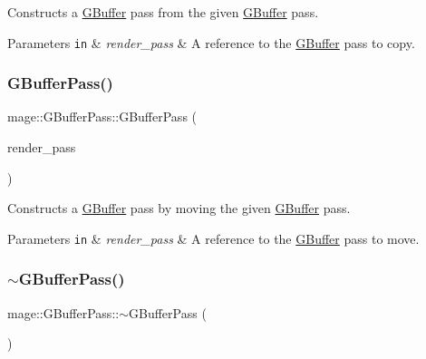 Constructs a \hyperlink{structmage_1_1_g_buffer}{G\+Buffer} pass from the given \hyperlink{structmage_1_1_g_buffer}{G\+Buffer} pass.


\begin{DoxyParams}[1]{Parameters}
\mbox{\tt in}  & {\em render\+\_\+pass} & A reference to the \hyperlink{structmage_1_1_g_buffer}{G\+Buffer} pass to copy. \\
\hline
\end{DoxyParams}
\hypertarget{classmage_1_1_g_buffer_pass_a61a520a53c7a8029280eb1fc62d71ce6}{}\label{classmage_1_1_g_buffer_pass_a61a520a53c7a8029280eb1fc62d71ce6} 
\subsubsection{\texorpdfstring{G\+Buffer\+Pass()}{GBufferPass()}\hspace{0.1cm}{\footnotesize\ttfamily [3/3]}}
{\footnotesize\ttfamily mage\+::\+G\+Buffer\+Pass\+::\+G\+Buffer\+Pass (\begin{DoxyParamCaption}\item[{\hyperlink{classmage_1_1_g_buffer_pass}{G\+Buffer\+Pass} \&\&}]{render\+\_\+pass }\end{DoxyParamCaption})\hspace{0.3cm}{\ttfamily [default]}}

Constructs a \hyperlink{structmage_1_1_g_buffer}{G\+Buffer} pass by moving the given \hyperlink{structmage_1_1_g_buffer}{G\+Buffer} pass.


\begin{DoxyParams}[1]{Parameters}
\mbox{\tt in}  & {\em render\+\_\+pass} & A reference to the \hyperlink{structmage_1_1_g_buffer}{G\+Buffer} pass to move. \\
\hline
\end{DoxyParams}
\hypertarget{classmage_1_1_g_buffer_pass_a34b2735cfb9b3546c903760f42ff770c}{}\label{classmage_1_1_g_buffer_pass_a34b2735cfb9b3546c903760f42ff770c} 
\subsubsection{\texorpdfstring{$\sim$\+G\+Buffer\+Pass()}{~GBufferPass()}}
{\footnotesize\ttfamily mage\+::\+G\+Buffer\+Pass\+::$\sim$\+G\+Buffer\+Pass (\begin{DoxyParamCaption}{ }\end{DoxyParamCaption})\hspace{0.3cm}{\ttfamily [default]}}

